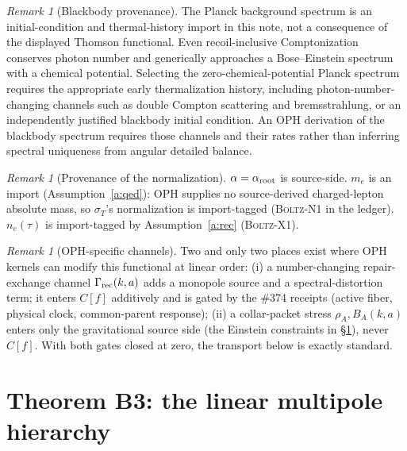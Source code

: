 \documentclass[11pt]{article}
\theoremstyle{remark}
\newtheorem{remark}[theorem]{Remark}
\begin{document}
\begin{remark}[Blackbody provenance]
The Planck background spectrum is an initial-condition and thermal-history
import in this note, not a consequence of the displayed Thomson functional.
Even recoil-inclusive Comptonization conserves photon number and generically
approaches a Bose--Einstein spectrum with a chemical potential. Selecting
the zero-chemical-potential Planck spectrum requires the appropriate early
thermalization history, including photon-number-changing channels such as
double Compton scattering and bremsstrahlung, or an independently justified
blackbody initial condition. An OPH derivation of the blackbody spectrum
requires those channels and their rates rather than inferring
spectral uniqueness from angular detailed balance.
\end{remark}

\begin{remark}[Provenance of the normalization]
$\alpha=\alpha_{\rm root}$ is source-side. $m_e$ is an import
(Assumption~\ref{a:qed}): OPH supplies no source-derived charged-lepton
absolute mass, so $\sigma_T$'s normalization is
import-tagged (\textsc{Boltz-N1} in the ledger). $n_e(\tau)$ is
import-tagged by Assumption~\ref{a:rec} (\textsc{Boltz-X1}).
\end{remark}

\begin{remark}[OPH-specific channels]\label{r:channels}
Two and only two places exist where OPH kernels can modify this functional
at linear order:
(i) a number-changing repair-exchange channel $\Gamma_{\rm rec}(k,a)$ adds a
monopole source and a spectral-distortion term; it enters $C[f]$
additively and is gated by the \#374 receipts (active fiber, physical clock,
common-parent response);
(ii) a collar-packet stress $\rho_A,B_A(k,a)$ enters only the gravitational
source side (the Einstein constraints in \S\ref{s:hierarchy}), never $C[f]$.
With both gates closed at zero, the transport below is exactly standard.
\end{remark}

\section{Theorem B3: the linear multipole hierarchy}\label{s:hierarchy}
\end{document}
